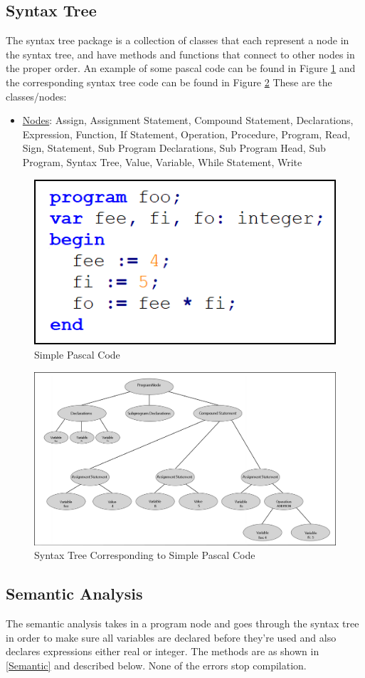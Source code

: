 \documentclass[english]{article}
\begin{document}
\subsection{Syntax Tree}

The syntax tree package is a collection of classes that each represent a node in the syntax tree, and have methods and functions that connect to other nodes in the proper order. An example of some pascal code can be found in Figure \ref{Tree Code} and the corresponding syntax tree code can be found in Figure  \ref{Syntax Tree} These are the classes/nodes:

\begin{itemize}
\item
\underline{Nodes}: Assign, Assignment Statement, Compound Statement, Declarations, Expression, Function, If Statement, Operation, Procedure, Program, Read, Sign, Statement, Sub Program Declarations, Sub Program Head, Sub Program, Syntax Tree, Value, Variable, While Statement, Write
\end{itemize}



\begin{figure}
\begin{center}
\includegraphics[width=.8   extwidth]{tree_code.PNG}
\end{center}
\caption{\label{Tree Code}Simple Pascal Code}
\end{figure}

\begin{figure}
\begin{center}
\includegraphics[width=1   extwidth]{syntax_tree.PNG}
\end{center}
\caption{\label{Syntax Tree}Syntax Tree Corresponding to Simple Pascal Code}
\end{figure}




\subsection{Semantic Analysis}


The semantic analysis takes in a program node and goes through the syntax tree in order to make sure all variables are declared before they're used and also declares expressions either real or integer. The methods are as shown in \ref{Semantic} and described below. None of the errors stop compilation.
\end{document}
